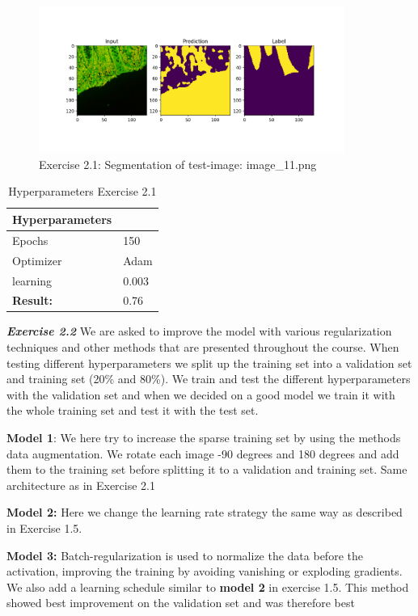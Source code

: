 \documentclass[a4paper,10pt]{article}
\begin{document}
\begin{figure}[ht!]
\centering
\includegraphics[width=100mm]{figures/assignment_3/segmentation_worst.png}
\caption{Exercise 2.1: Segmentation of test-image: image\_11.png}
\label{fig:worst}
\end{figure}

\begin{table}[ht!]
\centering
\begin{tabular}{ll}\hline 
 \textbf{Hyperparameters}&    \\ \hline
 Epochs&  150 \\ 
 Optimizer& Adam  \\
 learning& 0.003 \\ \hline
\textbf{Result: }&   0.76 \\ \hline
\end{tabular}
\caption{Hyperparameters Exercise 2.1}
\label{tab:tab8}
\end{table}

\textit{\textbf{Exercise 2.2}} We are asked to improve the model with various regularization techniques and other methods that are presented throughout the course. When testing different hyperparameters we split up the training set into a validation set and training set (20\% and 80\%). We train and test the different hyperparameters with the validation set and when we decided on a good model we train it with the whole training set and test it with the test set. 


\textbf{Model 1}: We here try to increase the sparse training set by using the methods data augmentation. We rotate each image -90 degrees and 180 degrees and add them to the training set before splitting it to a validation and training set. Same architecture as in Exercise 2.1 

\textbf{Model 2:} Here we change the learning rate strategy the same way as described in Exercise 1.5.
   

\textbf{Model 3:} Batch-regularization is used to normalize the data before the activation, improving the training by avoiding vanishing or exploding gradients. We also add a learning schedule similar to \textbf{model 2} in exercise 1.5. This method showed best improvement on the validation set and was therefore best 
\end{document}
